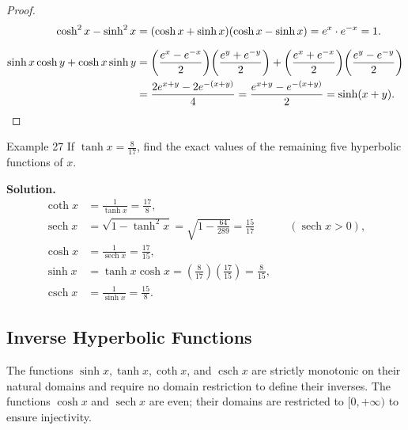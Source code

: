 \begin{proof}
\begin{align*}
\cosh^2 x - \sinh^2 x &= (\cosh x + \sinh x)(\cosh x - \sinh x) = e^x \cdot e^{-x} = 1. \\[6pt]
\sinh x \cosh y + \cosh x \sinh y &= \left(\frac{e^x - e^{-x}}{2}\right)\!\left(\frac{e^y + e^{-y}}{2}\right) + \left(\frac{e^x + e^{-x}}{2}\right)\!\left(\frac{e^y - e^{-y}}{2}\right) \\
&= \frac{2e^{x+y} - 2e^{-(x+y)}}{4} = \frac{e^{x+y} - e^{-(x+y)}}{2} = \sinh(x+y). \qedhere
\end{align*}
\end{proof}

\begin{examplebox}{Example 27}
If \(\tanh x = \frac{8}{17}\), find the exact values of the remaining five hyperbolic functions of \(x\).

\medskip
\textbf{Solution.}
\begin{align*}
\coth x &= \frac{1}{\tanh x} = \frac{17}{8}, \\[4pt]
\operatorname{sech} x &= \sqrt{1 - \tanh^2 x} = \sqrt{1 - \frac{64}{289}} = \frac{15}{17} && (\operatorname{sech} x > 0), \\[4pt]
\cosh x &= \frac{1}{\operatorname{sech} x} = \frac{17}{15}, \\[4pt]
\sinh x &= \tanh x \cosh x = \left(\frac{8}{17}\right)\!\left(\frac{17}{15}\right) = \frac{8}{15}, \\[4pt]
\operatorname{csch} x &= \frac{1}{\sinh x} = \frac{15}{8}.
\end{align*}
\end{examplebox}

\subsection*{Inverse Hyperbolic Functions}
\label{subsec:1.7.5}

The functions \(\sinh x, \tanh x, \coth x\), and \(\operatorname{csch} x\) are strictly monotonic on their natural domains and require no domain restriction to define their inverses. The functions \(\cosh x\) and \(\operatorname{sech} x\) are even; their domains are restricted to \([0, +\infty)\) to ensure injectivity.

